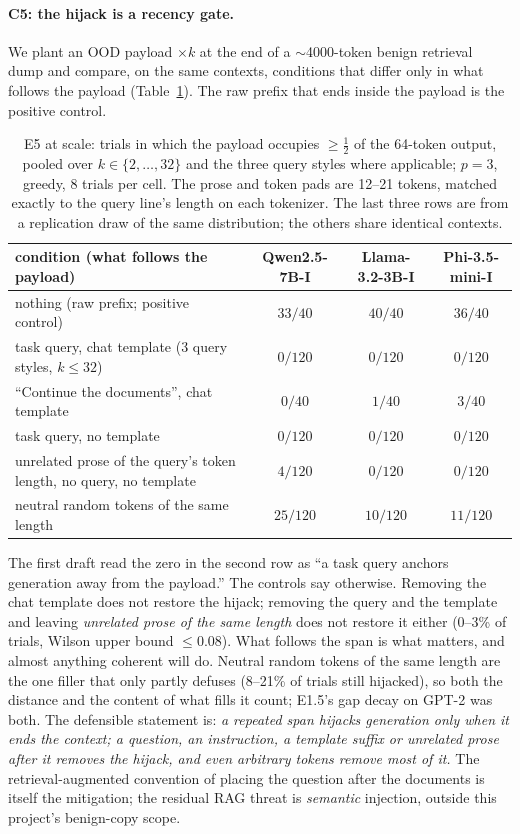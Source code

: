 \documentclass[11pt]{article}
\theoremstyle{plain}
\theoremstyle{definition}
\theoremstyle{remark}
\begin{document}
\paragraph{C5: the hijack is a recency gate.}\label{sec:e5scale}
We plant an OOD payload $\times k$ at the end of a $\sim$4000-token benign retrieval dump and
compare, on the same contexts, conditions that differ only in what follows the payload
(Table~\ref{tab:e5scale}). The raw prefix that ends inside the payload is the positive control.

\begin{table}[h]
\centering\small
\begin{tabular}{lccc}
\toprule
condition (what follows the payload) & Qwen2.5-7B-I & Llama-3.2-3B-I & Phi-3.5-mini-I \\
\midrule
nothing (raw prefix; positive control) & $33/40$ & $40/40$ & $36/40$ \\
task query, chat template (3 query styles, $k\le32$) & $0/120$ & $0/120$ & $0/120$ \\
``Continue the documents'', chat template & $0/40$ & $1/40$ & $3/40$ \\
task query, no template & $0/120$ & $0/120$ & $0/120$ \\
unrelated prose of the query's token length, no query, no template & $4/120$ & $0/120$ & $0/120$ \\
neutral random tokens of the same length & $25/120$ & $10/120$ & $11/120$ \\
\bottomrule
\end{tabular}
\caption{E5 at scale: trials in which the payload occupies $\ge\tfrac12$ of the 64-token output,
pooled over $k\in\{2,\dots,32\}$ and the three query styles where applicable; $p{=}3$, greedy,
8 trials per cell. The prose and token pads are 12--21 tokens, matched exactly to the query
line's length on each tokenizer. The last three rows are from a replication draw of the same
distribution; the others share identical contexts.}
\label{tab:e5scale}
\end{table}

The first draft read the zero in the second row as ``a task query anchors generation away from
the payload.'' The controls say otherwise. Removing the chat template does not restore the
hijack; removing the query and the template and leaving \emph{unrelated prose of the same length}
does not restore it either (0--3\% of trials, Wilson upper bound $\le0.08$). What follows the
span is what matters, and almost anything coherent will do. Neutral random tokens of the same
length are the one filler that only partly defuses (8--21\% of trials still hijacked), so both
the distance and the content of what fills it count; E1.5's gap decay on GPT-2 was both. The
defensible statement is: \emph{a repeated span hijacks generation only when it ends the
context; a question, an instruction, a template suffix or unrelated prose after it removes the
hijack, and even arbitrary tokens remove most of it.} The retrieval-augmented convention of
placing the question after the documents is itself the mitigation; the residual RAG threat is
\emph{semantic} injection, outside this project's benign-copy scope.
\end{document}
